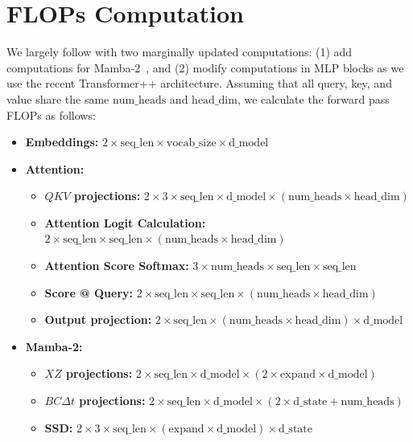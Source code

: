 \documentclass{article}
\newcommand{\citep}{\parencite}
\newcommand{\citet}{\textcite}
\theoremstyle{plain}
\theoremstyle{remark}
\begin{document}
\section{FLOPs Computation}
\label{sec: appendix-FLOPs_computation}
We largely follow \citet{Chinchilla} with two marginally updated computations: (1) add computations for Mamba-2~\citep{Mamba2}, and (2) modify computations in MLP blocks as we use the recent Transformer++ architecture.
Assuming that all query, key, and value share the same $\text{num\_heads}$ and $\text{head\_dim}$, we calculate the forward pass FLOPs as follows:
\begin{itemize}
    \item \textbf{Embeddings:} $2 \times \text{seq\_len} \times \text{vocab\_size} \times \text{d\_model}$
    \item \textbf{Attention:}
        \begin{itemize}
            \item \textbf{$QKV$ projections:} $2 \times 3 \times \text{seq\_len} \times \text{d\_model} \times (\text{num\_heads} \times \text{head\_dim})$
            \item \textbf{Attention Logit Calculation:} $2 \times \text{seq\_len} \times \text{seq\_len} \times (\text{num\_heads} \times \text{head\_dim})$
            \item \textbf{Attention Score Softmax:} $3 \times \text{num\_heads} \times \text{seq\_len} \times \text{seq\_len}$
            \item \textbf{Score @ Query:} $2 \times \text{seq\_len} \times \text{seq\_len} \times (\text{num\_heads} \times \text{head\_dim})$
            \item \textbf{Output projection:} $2 \times \text{seq\_len} \times (\text{num\_heads} \times \text{head\_dim}) \times \text{d\_model}$
        \end{itemize}
    \item \textbf{Mamba-2:}
        \begin{itemize}
            \item \textbf{$XZ$ projections:} $2 \times \text{seq\_len} \times \text{d\_model} \times (2 \times \text{expand} \times \text{d\_model})$
            \item \textbf{$BC \Delta t$ projections:} $2 \times \text{seq\_len} \times \text{d\_model} \times (2 \times \text{d\_state} + \text{num\_heads})$
            \item \textbf{SSD:} $2 \times 3 \times \text{seq\_len} \times (\text{expand} \times \text{d\_model}) \times \text{d\_state}$

\end{itemize}
\end{itemize}
\end{document}
